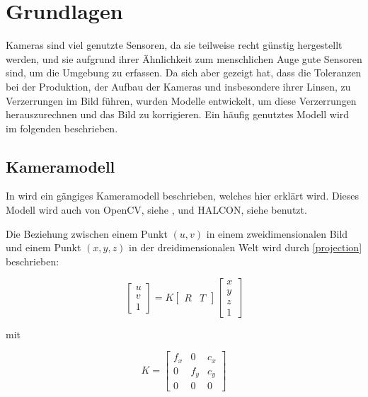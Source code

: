 \chapter{Grundlagen}
\label{chap:grundlagen}
Kameras sind viel genutzte Sensoren, da sie teilweise recht günstig hergestellt werden, und sie aufgrund ihrer Ähnlichkeit zum menschlichen Auge gute Sensoren sind, um die Umgebung zu erfassen. Da sich aber gezeigt hat, dass die Toleranzen bei der Produktion, der Aufbau der Kameras und insbesondere ihrer Linsen, zu Verzerrungen im Bild führen, wurden Modelle entwickelt, um diese Verzerrungen herauszurechnen und das Bild zu korrigieren. Ein häufig genutztes Modell wird im folgenden beschrieben.

\section{Kameramodell} %
\label{sec:kameramodell}
In \cite{Zhang} wird ein gängiges Kameramodell beschrieben, welches hier erklärt wird. Dieses Modell wird auch von OpenCV, siehe \cite{opencv}, und HALCON, siehe \cite{halcon} benutzt.

Die Beziehung zwischen einem Punkt $(u, v)$ in einem zweidimensionalen Bild und einem Punkt $(x, y, z)$ in der dreidimensionalen Welt wird durch \autoref{projection} beschrieben:

\begin{equation}
\begin{bmatrix}
 	u \\
 	v \\
 	1
\end{bmatrix} = K 
\begin{bmatrix}
   	R & T
\end{bmatrix} 
\begin{bmatrix}
   	x \\
   	y \\
   	z \\
   	1
\end{bmatrix} \label{projection}
\end{equation}

mit 

\begin{equation}
  K = 
  \begin{bmatrix}
  	f_x & 0 & c_x \\
  	0 & f_y & c_y \\
  	0 & 0 & 0
  \end{bmatrix}
\end{equation}

